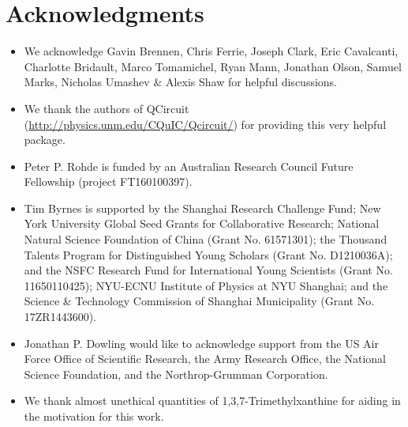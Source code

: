 %
%

\section*{Acknowledgments}

\begin{itemize}
\item We acknowledge Gavin Brennen, Chris Ferrie, Joseph Clark, Eric Cavalcanti, Charlotte Bridault, Marco Tomamichel, Ryan Mann, Jonathan Olson, Samuel Marks, Nicholas Umashev \& Alexis Shaw for helpful discussions.
\item We thank the authors of QCircuit (\href{http://physics.unm.edu/CQuIC/Qcircuit/}{http://physics.unm.edu/CQuIC/Qcircuit/}) for providing this very helpful package.
\item Peter P. Rohde is funded by an Australian Research Council Future Fellowship (project FT160100397).
\item Tim Byrnes is supported by the Shanghai Research Challenge Fund; New York University Global Seed Grants for Collaborative Research; National Natural Science Foundation of China (Grant No. 61571301); the Thousand Talents Program for Distinguished Young Scholars (Grant No. D1210036A); and the NSFC Research Fund for International Young Scientists (Grant No. 11650110425); NYU-ECNU Institute of Physics at NYU Shanghai; and the Science \& Technology Commission of Shanghai Municipality (Grant No. 17ZR1443600).
\item Jonathan P. Dowling would like to acknowledge support from the US Air Force Office of Scientific Research, the Army Research Office, the National Science Foundation, and the Northrop-Grumman Corporation.
\item We thank almost unethical quantities of 1,3,7-Trimethylxanthine for aiding in the motivation for this work.
\end{itemize}